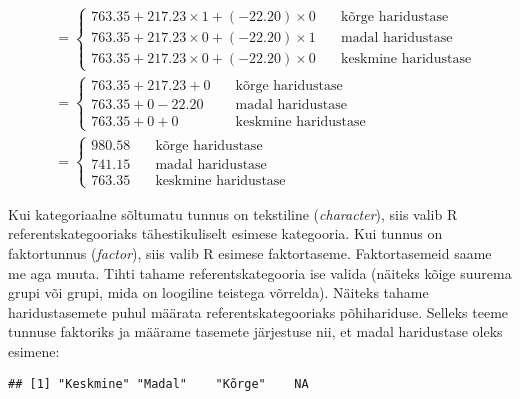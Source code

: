 \documentclass[
]{book}
\newenvironment{Shaded}{\begin{snugshade}}{\end{snugshade}}
\newcommand{\CommentTok}[1]{\textcolor[rgb]{0.56,0.35,0.01}{\textit{#1}}}
\newcommand{\FunctionTok}[1]{\textcolor[rgb]{0.00,0.00,0.00}{#1}}
\newcommand{\NormalTok}[1]{#1}
\newcommand{\SpecialCharTok}[1]{\textcolor[rgb]{0.00,0.00,0.00}{#1}}
\begin{document}
\begin{align}
&=
  \begin{cases}
    763.35+217.23 \times 1+(-22.20) \times 0 & \quad \text{kõrge haridustase}\\
    763.35+217.23 \times 0+(-22.20) \times 1 & \quad \text{madal haridustase}\\
    763.35+217.23 \times 0+(-22.20) \times 0 & \quad \text{keskmine haridustase}
  \end{cases}\\
&=
  \begin{cases}
    763.35+217.23+0  & \quad \text{kõrge haridustase}\\
    763.35+0-22.20  & \quad \text{madal haridustase}\\
    763.35+0+0  & \quad \text{keskmine haridustase}
  \end{cases}\\
&=
  \begin{cases}
    980.58  & \quad \text{kõrge haridustase}\\
    741.15  & \quad \text{madal haridustase}\\
    763.35  & \quad \text{keskmine haridustase}
  \end{cases}
\end{align}

Kui kategoriaalne sõltumatu tunnus on tekstiline (\emph{character}), siis valib R referentskategooriaks tähestikuliselt esimese kategooria. Kui tunnus on faktortunnus (\emph{factor}), siis valib R esimese faktortaseme. Faktortasemeid saame me aga muuta. Tihti tahame referentskategooria ise valida (näiteks kõige suurema grupi või grupi, mida on loogiline teistega võrrelda). Näiteks tahame haridustasemete puhul määrata referentskategooriaks põhihariduse. Selleks teeme tunnuse faktoriks ja määrame tasemete järjestuse nii, et madal haridustase oleks esimene:

\begin{Shaded}
\end{Shaded}

\begin{verbatim}
## [1] "Keskmine" "Madal"    "Kõrge"    NA
\end{verbatim}
\end{document}
